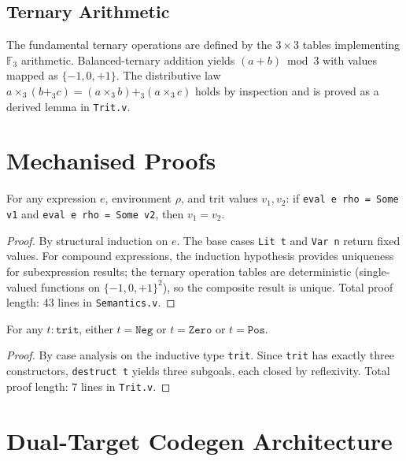 \subsection{Ternary Arithmetic}

The fundamental ternary operations are defined by the $3 \times 3$ tables implementing $\mathbb{F}_3$ arithmetic. Balanced-ternary addition yields $(a+b) \bmod 3$ with values mapped as $\{-1, 0, +1\}$. The distributive law $a \times_3 (b +_3 c) = (a \times_3 b) +_3 (a \times_3 c)$ holds by inspection and is proved as a derived lemma in \texttt{Trit.v}.

\section{Mechanised Proofs}

\begin{theorem}
\label{thm:eval-det}
For any expression $e$, environment $\rho$, and trit values $v_1, v_2$: if \texttt{eval e rho = Some v1} and \texttt{eval e rho = Some v2}, then $v_1 = v_2$.
\end{theorem}

\begin{proof}
By structural induction on $e$. The base cases \texttt{Lit t} and \texttt{Var n} return fixed values. For compound expressions, the induction hypothesis provides uniqueness for subexpression results; the ternary operation tables are deterministic (single-valued functions on $\{-1,0,+1\}^2$), so the composite result is unique. Total proof length: 43 lines in \texttt{Semantics.v}.
\end{proof}

\begin{theorem}
\label{thm:trit-exhaustive}
For any $t : \texttt{trit}$, either $t = \texttt{Neg}$ or $t = \texttt{Zero}$ or $t = \texttt{Pos}$.
\end{theorem}

\begin{proof}
By case analysis on the inductive type \texttt{trit}. Since \texttt{trit} has exactly three constructors, \texttt{destruct t} yields three subgoals, each closed by reflexivity. Total proof length: 7 lines in \texttt{Trit.v}.
\end{proof}

\section{Dual-Target Codegen Architecture}

